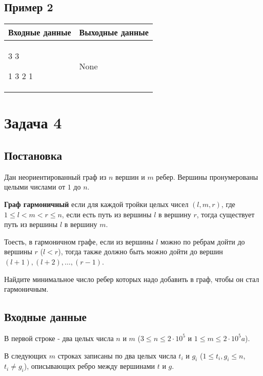 \documentclass{extarticle}
\begin{document}
\subsection*{Пример 2}
\label{sec:org8f2cdae}

\begin{table}[H]
\begin{center}
\begin{tabular}{|m{4cm}|m{4cm}|}
\hline
Входные данные & Выходные данные \\ \hline
3 3

1 3 2 1
&
None
\\ \hline
\end{tabular}
\end{center}
\end{table}

\pagebreak
\section*{Задача 4}
\label{sec:orgf257020}
\subsection*{Постановка}
\label{sec:org4fd2bea}

Дан неориентированный граф из \(n\) вершин
и \(m\) ребер.
Вершины пронумерованы целыми числами от \(1\) до \(n\).

\textbf{Граф гармоничный} если для каждой тройки целых чисел \((l,m,r)\), где
\(1 \leq l < m < r \leq n\),
если есть путь из вершины \(l\) в вершину \(r\),
тогда существует путь из вершины \(l\) в вершину \(m\).

Тоесть, в гармоничном графе, если из вершины \(l\)
можно по ребрам дойти до вершины
\(r\) (\(l<r\)), тогда также должно быть можно
дойти до вершин \((l+1),(l+2),\dots,(r−1)\).

Найдите минимальное число ребер которых надо добавить в граф,
чтобы он стал гармоничным.

\subsection*{Входные данные}
\label{sec:org50e0dd7}

В первой строке - два целых числа
\(n\) и \(m\) (\(3 \leq n \leq 2 \cdot 10^{5}\) и \(1 \leq m \leq 2 \cdot 10^{5}a\)).

В следующих \(m\) строках записаны по два целых числа
\(t_{i}\) и \(g_{i}\) (\(1 \leq t_{i}, g_{i} \leq n\), \(t_{i} \neq g_{i}\)),
описывающих ребро между вершинами \(t\) и \(g\).
\end{document}

